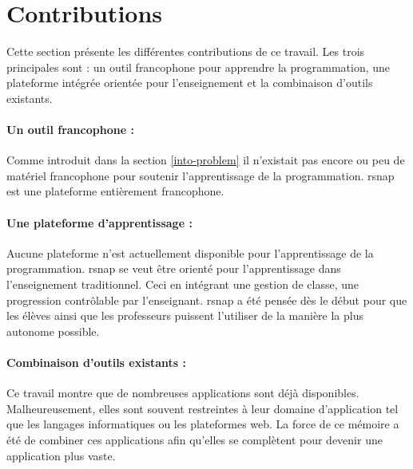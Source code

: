 \section{Contributions}
\label{intro-contribution}
Cette section présente les différentes contributions de ce travail. Les trois principales sont : un outil francophone pour apprendre la programmation, une plateforme intégrée orientée pour l'enseignement et la combinaison d'outils existants.

\paragraph{Un outil francophone :} Comme introduit dans la section \ref{into-problem} il n'existait pas encore ou peu de matériel francophone pour soutenir l'apprentissage de la programmation. \gls{rsnap} est une plateforme entièrement francophone.%

\paragraph{Une plateforme d'apprentissage :} Aucune plateforme n'est actuellement disponible pour l'apprentissage de la programmation. \gls{rsnap} se veut être orienté pour l'apprentissage dans l'enseignement traditionnel. Ceci en intégrant une gestion de classe, une progression contrôlable par l'enseignant. \gls{rsnap} a été pensée dès le début pour que les élèves ainsi que les professeurs puissent l'utiliser de la manière la plus autonome possible.

\paragraph{Combinaison d'outils existants :} Ce travail montre que de nombreuses applications sont déjà disponibles. Malheureusement, elles sont souvent restreintes à leur domaine d'application tel que les langages informatiques ou les plateformes web. La force de ce mémoire a été de combiner ces applications afin qu'elles se complètent pour devenir une application plus vaste.
